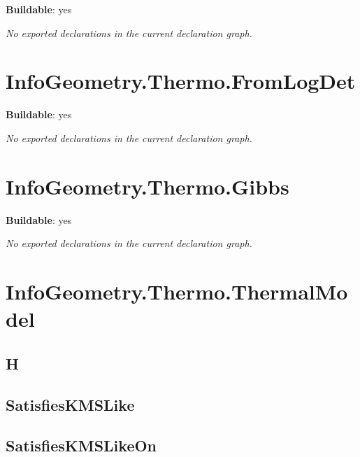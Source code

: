 \noindent\textbf{Buildable}: yes

\noindent\emph{No exported declarations in the current declaration graph.}

\section{InfoGeometry.Thermo.FromLogDet}

\noindent\textbf{Buildable}: yes

\noindent\emph{No exported declarations in the current declaration graph.}

\section{InfoGeometry.Thermo.Gibbs}

\noindent\textbf{Buildable}: yes

\noindent\emph{No exported declarations in the current declaration graph.}

\section{InfoGeometry.Thermo.ThermalModel}

\subsection*{H}

\begin{theorem}[blueprint="infogeometry:thermo:thermalmodel:h"]
\end{theorem}

\subsection*{SatisfiesKMSLike}

\begin{theorem}[blueprint="infogeometry:thermo:thermalmodel:satisfieskmslike"]
\end{theorem}

\subsection*{SatisfiesKMSLikeOn}

\begin{theorem}[blueprint="infogeometry:thermo:thermalmodel:satisfieskmslikeon"]
\end{theorem}

